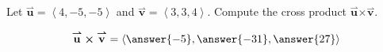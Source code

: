 \documentclass{ximera}
\author{Gregory Hartman \and Matthew Carr}
\begin{document}
\begin{exercise}

Let $\overset{\boldsymbol{\rightharpoonup}}{\mathbf{u}} = \left< 4,-5,-5 \right>$ and $\overset{\boldsymbol{\rightharpoonup}}{\mathbf{v}} = \left< 3,3,4 \right>$. Compute the cross product $\overset{\boldsymbol{\rightharpoonup}}{\mathbf{u}} \boldsymbol\times \overset{\boldsymbol{\rightharpoonup}}{\mathbf{v}}$.

\begin{prompt}
\[
\overset{\boldsymbol{\rightharpoonup}}{\mathbf{u}} \boldsymbol\times \overset{\boldsymbol{\rightharpoonup}}{\mathbf{v}} = \left< \answer{-5},\answer{-31},\answer{27} \right>
\]
\end{prompt}


\end{exercise}
\end{document}

